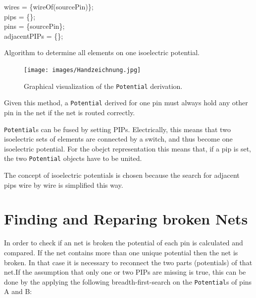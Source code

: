 \begin{algorithm}[h]
	wires = \{wireOf(sourcePin)\};\\
	pips = \{\};\\
	pins = \{sourcePin\};\\
	adjacentPIPs = \{\};\\
	
 \caption{Algorithm to determine all elements on one isoelectric potential.}
 \label{alg:findingpotential}
\end{algorithm}

\begin{figure}
\texttt{[image: images/Handzeichnung.jpg]}
\caption{Graphical visualization of the \texttt{Potential} derivation.}
\label{fig:buildpotential}
\end{figure}

Given this method, a \texttt{Potential} derived for one pin must always hold any other pin in the net if the net is routed correctly.

\texttt{Potential}s can be fused by setting PIPs. Electrically, this means that two isoelectric sets of elements are connected by a switch, and thus become one isoelectric potential. For the obejct representation this means that, if a pip is set, the two \texttt{Potential} objects have to be united.

The concept of isoelectric potentials is chosen because the search for adjacent pips wire by wire is simplified this way.



\section{Finding and Reparing broken Nets}
\label{sec:findingandrepairingbrokennets}

In order to check if an net is broken the potential of each pin is calculated and compared. If the net contains more than one unique potential then the net is broken.
In that case it is necessary to reconnect the two parts (potentials) of that net.If the assumption that only one or two PIPs are missing is true, this can be done by the applying the following breadth-first-search on the \texttt{Potential}s of pins A and B:

